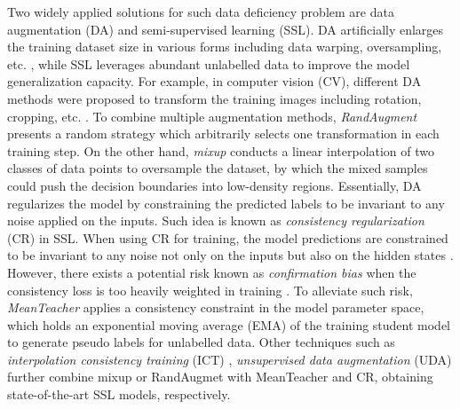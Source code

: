 \documentclass[a4paper]{article}
\begin{document}
Two widely applied solutions for such data deficiency problem are data augmentation (DA) and semi-supervised learning (SSL). DA artificially enlarges the training dataset size in various forms including data warping, oversampling, etc. \cite{shorten2019survey}, while SSL leverages abundant unlabelled data to improve the model generalization capacity. For example, in computer vision (CV), different DA methods were proposed to transform the training images including rotation, cropping, etc. \cite{shorten2019survey}. To combine multiple augmentation methods, \textit{RandAugment} \cite{cubuk2020randaugment} presents a random strategy which arbitrarily selects one transformation in each training step. On the other hand, \textit{mixup} \cite{zhang2017mixup, tokozume2017learning} conducts a linear interpolation of two classes of data points to oversample the dataset, by which the mixed samples could push the decision boundaries into low-density regions. Essentially, DA regularizes the model by constraining the predicted labels to be invariant to any noise applied on the inputs. Such idea is known as \textit{consistency regularization} (CR) in SSL. When using CR for training, the model predictions are constrained to be invariant to any noise not only on the inputs \cite{verma2019interpolation} but also on the hidden states \cite{bachman2014learning, laine2016temporal}. However, there exists a potential risk known as \emph{confirmation bias} when the consistency loss is too heavily weighted in training \cite{tarvainen2017mean}. To alleviate such risk, \textit{MeanTeacher} \cite{tarvainen2017mean} applies a consistency constraint in the model parameter space, which holds an exponential moving average (EMA) of the training student model to generate pseudo labels for unlabelled data. Other techniques such as \textit{interpolation consistency training} (ICT) \cite{verma2019interpolation}, \textit{unsupervised data augmentation} (UDA) \cite{xie2019unsupervised} further combine mixup or RandAugmet with MeanTeacher and CR, obtaining state-of-the-art SSL models, respectively. 
\end{document}
